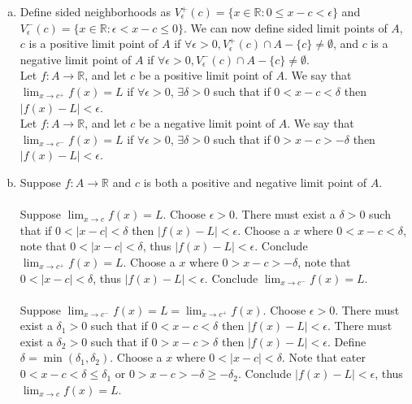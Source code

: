 \documentclass[12pt]{article}
\theoremstyle{homework}
\begin{document}
\begin{enumerate}[(a)]

\item
Define sided neighborhoods as $V^+_\epsilon(c)=\{x\in\mathbb{R}:0\leq x-c <\epsilon\}$ and $V^-_\epsilon(c)=\{x\in\mathbb{R}:\epsilon< x-c \leq 0\}$.  We can now define sided limit points of $A$, $c$ is a positive limit point of $A$ if $\forall \epsilon>0,  V^+_\epsilon(c)\cap A-\{c\}\neq \emptyset$, and $c$ is a negative limit point of $A$ if $\forall \epsilon>0,  V^-_\epsilon(c)\cap A-\{c\}\neq \emptyset$.\\
Let $f:A\rightarrow \mathbb{R}$, and let $c$ be a positive limit point of $A$.  We say that $\lim_{x\rightarrow c^+} f(x)=L$ if $\forall \epsilon>0$, $\exists \delta>0$ such that if $0<x-c<\delta$ then $|f(x)-L|<\epsilon$.\\
Let $f:A\rightarrow \mathbb{R}$, and let $c$ be a negative limit point of $A$.  We say that $\lim_{x\rightarrow c^-} f(x)=L$ if $\forall \epsilon>0$, $\exists \delta>0$ such that if $0>x-c>-\delta$ then $|f(x)-L|<\epsilon$.
\item
Suppose $f:A\rightarrow \mathbb{R}$ and $c$ is both a positive and negative limit point of $A$.\\\\
Suppose $\lim_{x\rightarrow c} f(x)=L$.  Choose $\epsilon>0$. There must exist a $\delta>0$ such that if $0<|x-c|<\delta$ then $|f(x)-L|<\epsilon$.  Choose a $x$ where $0<x-c<\delta$, note that $0<|x-c|<\delta$, thus $|f(x)-L|<\epsilon$.  Conclude $\lim_{x\rightarrow c^+} f(x)=L$.  Choose a $x$ where $0>x-c>-\delta$, note that $0<|x-c|<\delta$, thus $|f(x)-L|<\epsilon$.  Conclude $\lim_{x\rightarrow c^-} f(x)=L$.\\\\
Suppose $\lim_{x\rightarrow c^-} f(x)=L=\lim_{x\rightarrow c^+} f(x)$.  Choose $\epsilon>0$. There must exist a $\delta_1>0$ such that if $0<x-c<\delta$ then $|f(x)-L|<\epsilon$.  There must exist a $\delta_2>0$ such that if $0>x-c>\delta$ then $|f(x)-L|<\epsilon$.  Define $\delta=\min(\delta_1,\delta_2)$.  Choose a $x$ where $0<|x-c|<\delta$.  Note that eater $0<x-c<\delta\leq \delta_1$ or $0>x-c>-\delta\geq -\delta_2$.  Conclude $|f(x)-L|<\epsilon$, thus $\lim_{x\rightarrow c} f(x)=L$.
\end{enumerate}
\end{document}

